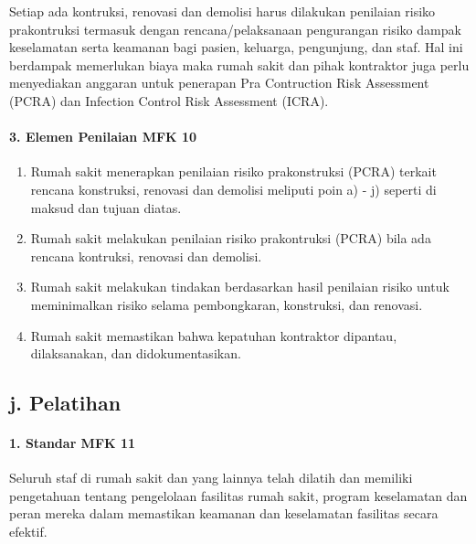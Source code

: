 \documentclass[
]{book}
\providecommand{\tightlist}{%
  \setlength{\itemsep}{0pt}\setlength{\parskip}{0pt}}
\begin{document}
Setiap ada kontruksi, renovasi dan demolisi harus dilakukan penilaian risiko prakontruksi termasuk dengan rencana/pelaksanaan pengurangan risiko dampak keselamatan serta keamanan bagi pasien, keluarga, pengunjung, dan staf. Hal ini berdampak memerlukan biaya maka rumah sakit dan pihak kontraktor juga perlu menyediakan anggaran untuk penerapan Pra Contruction Risk Assessment (PCRA) dan Infection Control Risk Assessment (ICRA).

\hypertarget{elemen-penilaian-mfk-10}{%
\paragraph*{3. Elemen Penilaian MFK 10}\label{elemen-penilaian-mfk-10}}

\begin{enumerate}
\def\labelenumi{\alph{enumi}.}
\tightlist
\item
  Rumah sakit menerapkan penilaian risiko prakonstruksi (PCRA) terkait rencana konstruksi, renovasi dan demolisi meliputi poin a) - j) seperti di maksud dan tujuan diatas.
\item
  Rumah sakit melakukan penilaian risiko prakontruksi (PCRA) bila ada rencana kontruksi, renovasi dan demolisi.
\item
  Rumah sakit melakukan tindakan berdasarkan hasil penilaian risiko untuk meminimalkan risiko selama pembongkaran, konstruksi, dan renovasi.
\item
  Rumah sakit memastikan bahwa kepatuhan kontraktor dipantau, dilaksanakan, dan didokumentasikan.
\end{enumerate}

\hypertarget{j.-pelatihan}{%
\subsection*{j. Pelatihan}\label{j.-pelatihan}}

\hypertarget{standar-mfk-11}{%
\paragraph*{1. Standar MFK 11}\label{standar-mfk-11}}

Seluruh staf di rumah sakit dan yang lainnya telah dilatih dan memiliki pengetahuan tentang pengelolaan fasilitas rumah sakit, program keselamatan dan peran mereka dalam memastikan keamanan dan keselamatan fasilitas secara efektif.
\end{document}
